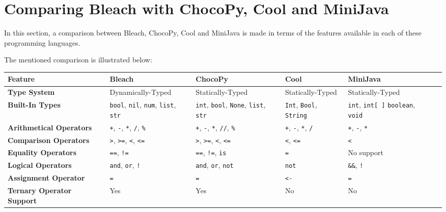 \section{Comparing Bleach with ChocoPy, Cool and MiniJava}
In this section, a comparison between Bleach, ChocoPy, Cool and MiniJava is made in terms of the features available in each of these programming languages.

The mentioned comparison is illustrated below:

\begin{table}[h!]
    \centering
    \begin{tabular}{|p{3.2cm}|p{3cm}|p{3cm}|p{3cm}|p{3cm}|p{3cm}|}
        \hline
        \textbf{Feature} & \textbf{Bleach} & \textbf{ChocoPy} & \textbf{Cool} & \textbf{MiniJava} \\  %
        \hline
        \textbf{Type System} & Dynamically-Typed & Statically-Typed & Statically-Typed & Statically-Typed \\  %
        \hline
        \textbf{Built-In Types} & \texttt{bool}, \texttt{nil}, \texttt{num}, \newline \texttt{list}, \texttt{str} & \texttt{int}, \texttt{bool}, \texttt{None}, \texttt{list}, \texttt{str} & \texttt{Int}, \texttt{Bool}, \texttt{String} & \texttt{int}, \texttt{int[ ]} \texttt{boolean}, \texttt{void} \\
        \hline
        \textbf{Arithmetical Operators} & \texttt{+}, \texttt{-}, \texttt{*}, \texttt{/}, \texttt{\%} & \texttt{+}, \texttt{-}, \texttt{*}, \texttt{//}, \texttt{\%} & \texttt{+}, \texttt{-}, \texttt{*}, \texttt{/} & \texttt{+}, \texttt{-}, \texttt{*} \\
        \hline
        \textbf{Comparison Operators} & \texttt{>}, \texttt{>=}, \texttt{<}, \texttt{<=} & \texttt{>}, \texttt{>=}, \texttt{<}, \texttt{<=} & \texttt{<}, \texttt{<=} & \texttt{<} \\
        \hline
        \textbf{Equality Operators} & \texttt{==}, \texttt{!=} & \texttt{==}, \texttt{!=}, \texttt{is} & \texttt{=} & No support \\
        \hline
        \textbf{Logical Operators} & \texttt{and}, \texttt{or}, \texttt{!} & \texttt{and}, \texttt{or}, \texttt{not} & \texttt{not} & \texttt{\&\&}, \texttt{!} \\
        \hline
        \textbf{Assignment Operator} & \texttt{=} & \texttt{=} & \texttt{<-} & \texttt{=} \\
        \hline
        \textbf{Ternary Operator Support} & Yes & Yes & No & No \\

\end{tabular}
\end{table}
